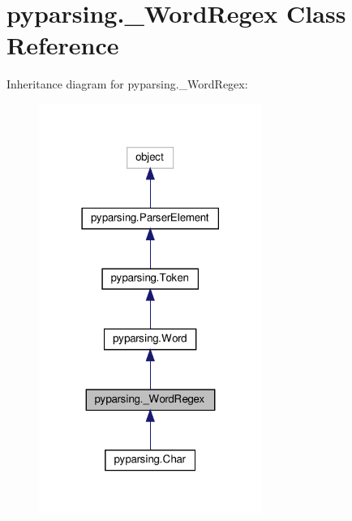 \hypertarget{classpyparsing_1_1__WordRegex}{}\section{pyparsing.\+\_\+\+Word\+Regex Class Reference}
\label{classpyparsing_1_1__WordRegex}


Inheritance diagram for pyparsing.\+\_\+\+Word\+Regex\+:
\nopagebreak
\begin{figure}[H]
\begin{center}
\leavevmode
\includegraphics[width=206pt]{classpyparsing_1_1__WordRegex__inherit__graph}
\end{center}
\end{figure}


